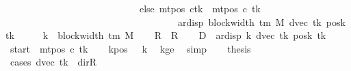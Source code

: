 \begin{isabellebody}
\ \ \ \ \ \ \ \ \ \ \ \ \ \ \ \ \ \ \ \ \ \ \ \ \ \ \ \ else\ {\isacharparenleft}{\kern0pt}mt{\isacharunderscore}{\kern0pt}pos\ c{}{\isacharparenright}{\kern0pt}{\isacharparenleft}{\kern0pt}tk\ {\isacharcolon}{\kern0pt}{\isacharequal}{\kern0pt}\ mt{\isacharunderscore}{\kern0pt}pos\ c{}\ tk\isanewline
\ \ \ \ \ \ \ \ \ \ \ \ \ \ \ \ \ \ \ \ \ \ \ \ \ \ \ \ \ \ \ \ \ \ \ {\isacharminus}{\kern0pt}\ ar{\isacharunderscore}{\kern0pt}disp\ {\isacharparenleft}{\kern0pt}block{\isacharunderscore}{\kern0pt}width\ {\isacharparenleft}{\kern0pt}{\isasymGamma}{\isacharunderscore}{\kern0pt}tm\ M{\isacharparenright}{\kern0pt}{\isacharparenright}{\kern0pt}\ {\isacharparenleft}{\kern0pt}dvec\ tk{\isacharparenright}{\kern0pt}\ {\isacharparenleft}{\kern0pt}posk\ tk{\isacharparenright}{\kern0pt}{\isacharparenright}{\kern0pt}{\isacharparenright}{\kern0pt}{\isachardoublequoteclose}\isanewline
%
\isadelimproof
%
\endisadelimproof
%
\isatagproof
{}\isamarkupfalse%
\ {\isacharminus}{\kern0pt}\isanewline
\ \ \isamarkupfalse%
\ {\isacharquery}{\kern0pt}k\ {\isacharequal}{\kern0pt}\ {\isachardoublequoteopen}block{\isacharunderscore}{\kern0pt}width\ {\isacharparenleft}{\kern0pt}{\isasymGamma}{\isacharunderscore}{\kern0pt}tm\ M{\isacharparenright}{\kern0pt}{\isachardoublequoteclose}\isanewline
\ \ \isamarkupfalse%
\ {\isacharquery}{\kern0pt}R\ {\isacharequal}{\kern0pt}\ R{\isacharprime}{\kern0pt}\isanewline
\ \ \isamarkupfalse%
\ {\isacharquery}{\kern0pt}D\ {\isacharequal}{\kern0pt}\ {\isachardoublequoteopen}ar{\isacharunderscore}{\kern0pt}disp\ {\isacharquery}{\kern0pt}k\ {\isacharparenleft}{\kern0pt}dvec\ tk{\isacharparenright}{\kern0pt}\ {\isacharparenleft}{\kern0pt}posk\ tk{\isacharparenright}{\kern0pt}{\isachardoublequoteclose}\isanewline
\ \ \isamarkupfalse%
\ {\isacharquery}{\kern0pt}start\ {\isacharequal}{\kern0pt}\ {\isachardoublequoteopen}mt{\isacharunderscore}{\kern0pt}pos\ c{}\ tk{\isachardoublequoteclose}\isanewline
\ \ \isamarkupfalse%
\ kpos{\isacharcolon}{\kern0pt}\ {\isachardoublequoteopen}{}\ {\isacharless}{\kern0pt}\ {\isacharquery}{\kern0pt}k{\isachardoublequoteclose}\ \isamarkupfalse%
\ kge{}\ \isamarkupfalse%
\ simp\isanewline
\ \ \isamarkupfalse%
\ {\isacharquery}{\kern0pt}thesis\isanewline
\ \ \isamarkupfalse%
\ {\isacharparenleft}{\kern0pt}cases\ {\isachardoublequoteopen}dvec\ tk\ {\isacharequal}{\kern0pt}\ dir{\isachardot}{\kern0pt}R{\isachardoublequoteclose}{\isacharparenright}{\kern0pt}\isanewline

\end{isabellebody}
